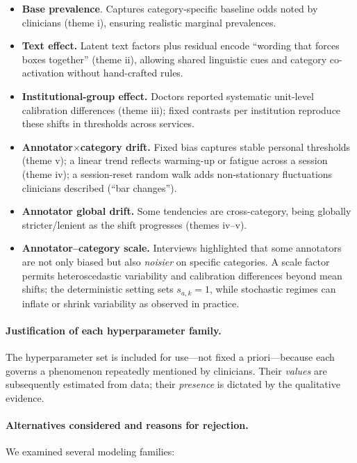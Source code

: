 \documentclass[12pt]{article}
\begin{document}
\begin{itemize}
\item \textbf{Base prevalence}. Captures category-specific baseline odds noted by clinicians (theme i), ensuring realistic marginal prevalences.
\item \textbf{Text effect.} Latent text factors plus residual encode “wording that forces boxes together” (theme ii), allowing shared linguistic cues and category co-activation without hand-crafted rules.
\item \textbf{Institutional-group effect.} Doctors reported systematic unit-level calibration differences (theme iii); fixed contrasts per institution reproduce these shifts in thresholds across services.
\item \textbf{Annotator$\times$category drift.} Fixed bias captures stable personal thresholds (theme v); a linear trend reflects warming-up or fatigue across a session (theme iv); a session-reset random walk adds non-stationary fluctuations clinicians described (“bar changes”).
\item \textbf{Annotator global drift.} Some tendencies are cross-category, being globally stricter/lenient as the shift progresses (themes iv–v).
\item \textbf{Annotator–category scale.} Interviews highlighted that some annotators are not only biased but also \emph{noisier} on specific categories. A scale factor permits heteroscedastic variability and calibration differences beyond mean shifts; the deterministic setting sets $s_{a,k}=1$, while stochastic regimes can inflate or shrink variability as observed in practice.
\end{itemize}

\paragraph{Justification of each hyperparameter family.}
The hyperparameter set is included for use—not fixed a priori—because each governs a phenomenon repeatedly mentioned by clinicians. Their \emph{values} are subsequently estimated from data; their \emph{presence} is dictated by the qualitative evidence.

\paragraph{Alternatives considered and reasons for rejection.}
We examined several modeling families:
\end{document}

